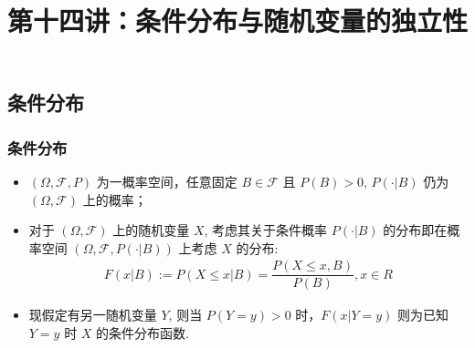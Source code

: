 \documentclass[Prob-All.tex]{subfiles}
\begin{document}
\title[概率论]{第十四讲：条件分布与随机变量的独立性}
\date{}





{ 
	\begin{frame}
		\titlepage
	\end{frame}
}
\subsection{条件分布}
\begin{frame}
	\frametitle{条件分布}
	\begin{itemize}[<+-|alert@+>]
		\item $(\Omega,\mathcal{F},P)$ 为一概率空间，任意固定 $B\in\mathcal{F}$ 且 $P (B)>0$, $P (\cdot|B)$ 仍为 $(\Omega,\mathcal{F})$ 上的概率；
		\item 对于 $(\Omega,\mathcal{F})$ 上的随机变量 $X$, 考虑其关于条件概率 $P (\cdot|B)$ 的分布即在概率空间 $(\Omega,\mathcal{F},P (\cdot|B))$ 上考虑 $X$ 的分布:
		\begin{eqnarray*}
			F(x|B):=P(X\le x|B)=\dfrac{P(X\le x, B)}{P(B)}, x\in R
		\end{eqnarray*}
		\item 现假定有另一随机变量 $Y$, 则当 $P (Y=y)>0$ 时，$F (x|Y=y)$ 则为已知 $Y=y$ 时 $X$ 的条件分布函数.
	\end{itemize}

\end{frame}
\end{document}
